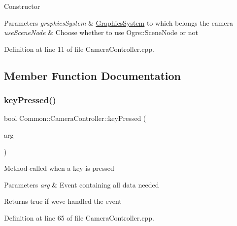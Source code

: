 Constructor 
\begin{DoxyParams}{Parameters}
{\em graphics\+System} & \hyperlink{class_common_1_1_graphics_system}{Graphics\+System} to which belongs the camera \\
\hline
{\em use\+Scene\+Node} & Choose whether to use Ogre\+::\+Scene\+Node or not \\
\hline
\end{DoxyParams}


Definition at line 11 of file Camera\+Controller.\+cpp.



\subsection{Member Function Documentation}
\mbox{\label{class_common_1_1_camera_controller_aefb0839a3f45e4390c764762b7a053a1}} 
\subsubsection{\texorpdfstring{key\+Pressed()}{keyPressed()}}
{\footnotesize\ttfamily bool Common\+::\+Camera\+Controller\+::key\+Pressed (\begin{DoxyParamCaption}\item[{const \hyperlink{struct_s_d_l___keyboard_event}{S\+D\+L\+\_\+\+Keyboard\+Event} \&}]{arg }\end{DoxyParamCaption})\hspace{0.3cm}{\ttfamily [virtual]}}

Method called when a key is pressed 
\begin{DoxyParams}{Parameters}
{\em arg} & Event containing all data needed \\
\hline
\end{DoxyParams}
\begin{DoxyReturn}{Returns}
true if we\textquotesingle{}ve handled the event 
\end{DoxyReturn}


Definition at line 65 of file Camera\+Controller.\+cpp.

\mbox{\label{class_common_1_1_camera_controller_a2ade17644b5c6a9249b6fcff6c358b2e}} 

